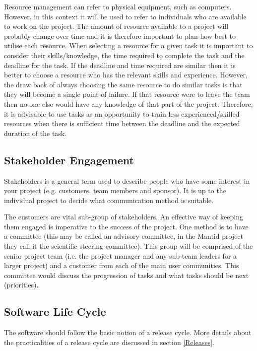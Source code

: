 \documentclass[jnr]{iosart2x}
\begin{document}
Resource management can refer to physical equipment, such as computers.
However, in this context it will be used to refer to individuals who are available to work on the project.
The amount of resource available to a project will probably change over time and it is therefore important to plan how best to utilise each resource.
When selecting a resource for a given task it is important to consider their skills/knowledge, the time required to complete the task and the deadline for the task.
If the deadline and time required are similar then it is better to choose a resource who has the relevant skills and experience.
However, the draw back of always choosing the same resource to do similar tasks is that they will become a single point of failure.
If that resource were to leave the team then no-one else would have any knowledge of that part of the project.
Therefore, it is advisable to use tasks as an opportunity to train less experienced/skilled resources when there is sufficient time between the deadline and the expected duration of the task.

\subsection{Stakeholder Engagement}
\label{se}

Stakeholders is a general term used to describe people who have some interest in your project (e.g. customers, team members and sponsor).
It is up to the individual project to decide what communication method is suitable.

The customers are vital sub-group of stakeholders.
An effective way of keeping them engaged is imperative to the success of the project.
One method is to have a committee (this may be called an advisory committee, in the Mantid project they call it the scientific steering committee).
This group will be comprised of the senior project team (i.e. the project manager and any sub-team leaders for a larger project) and a customer from each of the main user communities.
This committee would discuss the progression of tasks and what tasks should be next (priorities).

\subsection{Software Life Cycle}
\label{lc}

The software should follow the basic notion of a release cycle. More details about the practicalities of a release cycle are discussed in section \ref{Releases}.
\end{document}

